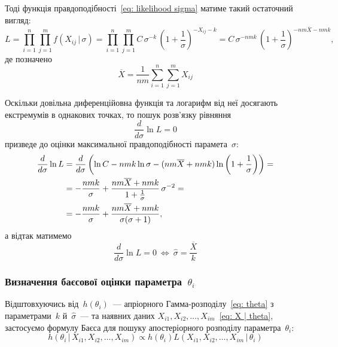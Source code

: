 \documentclass{mathreport}
\begin{document}
Тоді функція правдоподібності~\eqref{eq: likelihood sigma} матиме такий остаточний вигляд:
\begin{equation}
    L = \prod\limits_{i=1}^{n} \prod\limits_{j=1}^{m} f(X_{ij} \,|\, \sigma) = \prod\limits_{i=1}^{n} \prod\limits_{j=1}^{m} C \, \sigma^{-k}\, \left( 1+\frac{1}{\sigma}\right)^{-X_{ij}-k} = C \, \sigma^{-nmk}\, \left( 1+\frac{1}{\sigma}\right)^{-nm\overline{X}-nmk},
\end{equation}
де позначено
\begin{equation}
    \overline{X} = \frac{1}{nm}\sum\limits_{i=1}^{n} \sum\limits_{j=1}^{m} X_{ij}
\end{equation}

Оскільки довільна диференційовна функція та логарифм від неї досягають екстремумів в однакових точках, то пошук розв'язку рівняння
\begin{equation}
    \frac{d}{d\sigma} \ln{L} = 0
\end{equation}
призведе до оцінки максимальної правдоподібності парамета~$\sigma:$
\begin{align}
    \frac{d}{d\sigma} \ln{L} & = \frac{d}{d\sigma} \left( \ln{C} - nmk\ln{\sigma} - (nm\overline{X}+nmk)\ln{\left( 1+\frac{1}{\sigma} \right)} \right) = \notag \\
    & = -\frac{nmk}{\sigma} + \frac{nm\overline{X}+nmk}{1+\frac{1}{\sigma}}\,\sigma^{-2} = \notag \\
    & = -\frac{nmk}{\sigma} + \frac{nm\overline{X}+nmk}{\sigma(\sigma+1)},
\end{align}
а відтак матимемо
\begin{equation}\label{eq: sigma MLE}
    \frac{d}{d\sigma} \ln{L} = 0 \ \Longleftrightarrow \ \widehat{\sigma} = \frac{\overline{X}}{k}
\end{equation}

\subsubsection*{Визначення баєсової оцінки параметра~$\theta_i$}

Відштовхуючись від~$h(\theta_i)$~--- апріорного Гамма-розподілу~\eqref{eq: theta} з параметрами~$k$ й~$\widehat{\sigma}$~--- та наявних даних $X_{i1},X_{i2},\ldots,X_{im}$~\eqref{eq: X | theta}, застосуємо формулу Баєса для пошуку апостеріорного розподілу параметра~$\theta_i:$
\begin{equation}
    h(\theta_i \,|\, X_{i1},X_{i2},\ldots,X_{im}) \propto h(\theta_i) L(X_{i1},X_{i2},\ldots,X_{im} \,|\, \theta_i)
\end{equation}
\end{document}
